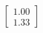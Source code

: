 \documentclass[preview]{standalone}
\begin{document}
\begin{align*}
\begin{bmatrix} 1.00 \\ 1.33 \end{bmatrix}
\end{align*}
\end{document}
